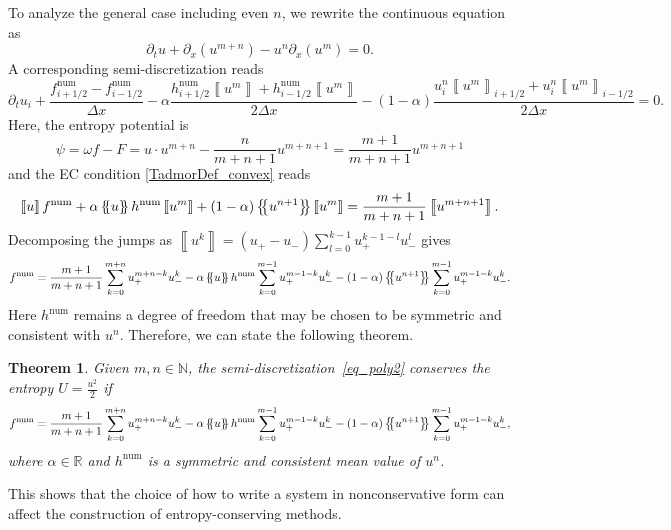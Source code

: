\documentclass[]{scrartcl}
\newcommand*{\ldblbrace}{\{\mskip-5mu \left \{}
\newcommand*{\rdblbrace}{ \}\mskip-5mu \right \}}
\newcommand{\mean}[1]{\left\ldblbrace #1 \right\rdblbrace}
\newcommand{\jump}[1]{\left\llbracket #1  \right\rrbracket}
\newtheorem{theorem}{Theorem}[section]
\theoremstyle{definition}
\begin{document}
To analyze the general case including even $n$, we rewrite the continuous equation as
\begin{equation}
\partial_t u + \partial_x (u^{m+n}) - u^{n}\partial_x (u^m) = 0.
\end{equation}
A corresponding semi-discretization reads
\begin{equation}
\partial_t u_i + \frac{f^\mathrm{num}_{i+1/2} - f^\mathrm{num}_{i-1/2}}{\Delta x} - \alpha \frac{h^{\mathrm{num}}_{i+1/2}\jump{u^m} + h^{\mathrm{num}}_{i-1/2}\jump{u^m}}{2 \Delta x} - (1-\alpha) \frac{u^n_i \jump{u^m}_{i+1/2} + u^n_i \jump{u^m}_{i-1/2}}{2 \Delta x} = 0.
\label{eq_poly2}
\end{equation}
Here, the entropy potential is
\begin{equation}
\psi = \omega f - F = u \cdot u^{m+n} - \frac{n}{m+n+1} u^{m+n+1} = \frac{m+1}{m+n+1} u^{m+n+1}
\end{equation}
and the EC condition \eqref{TadmorDef_convex} reads
\begin{equation}
\jump{u} f^{\mathrm{num}} + \alpha \mean{u} h^{\mathrm{num}} \jump{u^m} + (1-\alpha) \mean{u^{n+1}} \jump{u^m} = \frac{m+1}{m+n+1} \jump{u^{m+n+1}}.
\end{equation}
Decomposing the jumps as $\jump{u^k} = (u_+ - u_-) \sum_{l=0}^{k-1} u_+^{k-1-l} u_-^l$ gives
\begin{equation}
f^{\mathrm{num}} = \frac{m+1}{m+n+1} \sum_{k=0}^{m+n} u_+^{m+n-k} u_-^k - \alpha \mean{u} h^{\mathrm{num}} \sum_{k=0}^{m-1} u_+^{m-1-k} u_-^k - (1-\alpha) \mean{u^{n+1}} \sum_{k=0}^{m-1} u_+^{m-1-k} u_-^k.
\end{equation}
Here $h^{\mathrm{num}}$ remains a degree of freedom that may be chosen to be symmetric and consistent with $u^n$. Therefore, we can state the following theorem.
\begin{theorem}
Given $m, n \in \mathbb{N}$, the semi-discretization~\eqref{eq_poly2} conserves the entropy $U = \frac{u^2}{2}$ if
\begin{equation}\label{ec_2_monomial}
f^\mathrm{num} =  \frac{m+1}{m+n+1} \sum_{k=0}^{m+n} u_+^{m+n-k} u_-^k - \alpha \mean{u} h^{\mathrm{num}} \sum_{k=0}^{m-1} u_+^{m-1-k} u_-^k - (1-\alpha) \mean{u^{n+1}} \sum_{k=0}^{m-1} u_+^{m-1-k} u_-^k,
\end{equation}
where $\alpha \in \mathbb{R}$ and $h^\mathrm{num}$ is a symmetric and consistent mean value of $u^n$.
\end{theorem}

This shows that the choice of how to write a system in nonconservative form can affect the construction of entropy-conserving methods.
\end{document}
